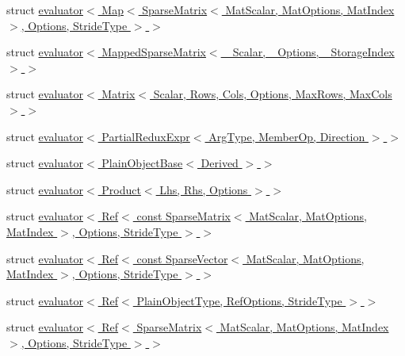 \begin{DoxyCompactItemize}
\item 
struct \hyperlink{struct_eigen_1_1internal_1_1evaluator_3_01_map_3_01_sparse_matrix_3_01_mat_scalar_00_01_mat_optic7190da6f4a73606f624a88388745a36}{evaluator$<$ Map$<$ Sparse\+Matrix$<$ Mat\+Scalar, Mat\+Options, Mat\+Index $>$, Options, Stride\+Type $>$ $>$}
\item 
struct \hyperlink{struct_eigen_1_1internal_1_1evaluator_3_01_mapped_sparse_matrix_3_01___scalar_00_01___options_00_01___storage_index_01_4_01_4}{evaluator$<$ Mapped\+Sparse\+Matrix$<$ \+\_\+\+Scalar, \+\_\+\+Options, \+\_\+\+Storage\+Index $>$ $>$}
\item 
struct \hyperlink{struct_eigen_1_1internal_1_1evaluator_3_01_matrix_3_01_scalar_00_01_rows_00_01_cols_00_01_optionc8e41d58a4f0b7a4fe2e5592b375183d}{evaluator$<$ Matrix$<$ Scalar, Rows, Cols, Options, Max\+Rows, Max\+Cols $>$ $>$}
\item 
struct \hyperlink{struct_eigen_1_1internal_1_1evaluator_3_01_partial_redux_expr_3_01_arg_type_00_01_member_op_00_01_direction_01_4_01_4}{evaluator$<$ Partial\+Redux\+Expr$<$ Arg\+Type, Member\+Op, Direction $>$ $>$}
\item 
struct \hyperlink{struct_eigen_1_1internal_1_1evaluator_3_01_plain_object_base_3_01_derived_01_4_01_4}{evaluator$<$ Plain\+Object\+Base$<$ Derived $>$ $>$}
\item 
struct \hyperlink{struct_eigen_1_1internal_1_1evaluator_3_01_product_3_01_lhs_00_01_rhs_00_01_options_01_4_01_4}{evaluator$<$ Product$<$ Lhs, Rhs, Options $>$ $>$}
\item 
struct \hyperlink{struct_eigen_1_1internal_1_1evaluator_3_01_ref_3_01const_01_sparse_matrix_3_01_mat_scalar_00_01_17d98bf798af280639e961c8a27d545c}{evaluator$<$ Ref$<$ const Sparse\+Matrix$<$ Mat\+Scalar, Mat\+Options, Mat\+Index $>$, Options, Stride\+Type $>$ $>$}
\item 
struct \hyperlink{struct_eigen_1_1internal_1_1evaluator_3_01_ref_3_01const_01_sparse_vector_3_01_mat_scalar_00_01_a519c1c897a6ea04f0cfeb49f9a37d05}{evaluator$<$ Ref$<$ const Sparse\+Vector$<$ Mat\+Scalar, Mat\+Options, Mat\+Index $>$, Options, Stride\+Type $>$ $>$}
\item 
struct \hyperlink{struct_eigen_1_1internal_1_1evaluator_3_01_ref_3_01_plain_object_type_00_01_ref_options_00_01_stride_type_01_4_01_4}{evaluator$<$ Ref$<$ Plain\+Object\+Type, Ref\+Options, Stride\+Type $>$ $>$}
\item 
struct \hyperlink{struct_eigen_1_1internal_1_1evaluator_3_01_ref_3_01_sparse_matrix_3_01_mat_scalar_00_01_mat_opti1f146c69a21d0c41f4f1c116a0c5fce2}{evaluator$<$ Ref$<$ Sparse\+Matrix$<$ Mat\+Scalar, Mat\+Options, Mat\+Index $>$, Options, Stride\+Type $>$ $>$}

\end{DoxyCompactItemize}
